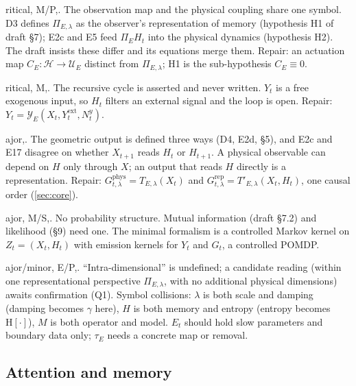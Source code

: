 \documentclass[11pt]{article}
\makeatletter
\theoremstyle{definition}
\theoremstyle{remark}
\def\finding@split#1,#2\@nil{\textbf{#1}\if\relax\detokenize{#2}\relax\else\ (\ignorespaces\finding@strip#2\@nil)\fi}
\def\finding@strip#1,\@nil{#1}
\newenvironment{finding}[1][]{\par\smallskip\noindent\finding@split#1,\@nil.\enspace\ignorespaces}{\par\smallskip}
\makeatother
\begin{document}
\begin{finding}[F1, critical, M/P] The observation map and the physical coupling share one symbol. D3 defines $\Pi_{E,\lambda}$ as the observer's representation of memory (hypothesis H1 of draft \S7); E2c and E5 feed $\Pi_E H_t$ into the physical dynamics (hypothesis H2). The draft insists these differ and its equations merge them. Repair: an actuation map $C_E:\mathcal H\to\mathcal U_E$ distinct from $\Pi_{E,\lambda}$; H1 is the sub-hypothesis $C_E\equiv0$.
\end{finding}

\begin{finding}[F2, critical, M] The recursive cycle is asserted and never written. $Y_t$ is a free exogenous input, so $H_t$ filters an external signal and the loop is open. Repair: $Y_t=\mathcal Y_E(X_t,Y^{\mathrm{ext}}_t,N^y_t)$.
\end{finding}

\begin{finding}[F3--F4, major] The geometric output is defined three ways (D4, E2d, \S5), and E2c and E17 disagree on whether $X_{t+1}$ reads $H_t$ or $H_{t+1}$. A physical observable can depend on $H$ only through $X$; an output that reads $H$ directly is a representation. Repair: $G^{\mathrm{phys}}_{t,\lambda}=T_{E,\lambda}(X_t)$ and $G^{\mathrm{rep}}_{t,\lambda}=T'_{E,\lambda}(X_t,H_t)$, one causal order (\cref{sec:core}).
\end{finding}

\begin{finding}[F5, major, M/S] No probability structure. Mutual information (draft \S7.2) and likelihood (\S9) need one. The minimal formalism is a controlled Markov kernel on $Z_t=(X_t,H_t)$ with emission kernels for $Y_t$ and $G_t$, a controlled POMDP.
\end{finding}

\begin{finding}[F6--F8, major/minor, E/P] ``Intra-dimensional'' is undefined; a candidate reading (within one representational perspective $\Pi_{E,\lambda}$, with no additional physical dimensions) awaits confirmation (Q1). Symbol collisions: $\lambda$ is both scale and damping (damping becomes $\gamma$ here), $H$ is both memory and entropy (entropy becomes $\mathrm H[\cdot]$), $M$ is both operator and model. $E_t$ should hold slow parameters and boundary data only; $\tau_E$ needs a concrete map or removal.
\end{finding}

\subsection{Attention and memory}\label{sec:audit-attention}
\end{document}
